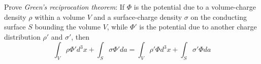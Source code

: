 \documentclass{article}
\begin{document}
\setcounter{problem}{11}
\begin{problem}
	Prove \textit{Green's reciprocation theorem}: If $\Phi$ is the potential due to a volume-charge density $\rho$ within a volume $V$ and a surface-charge density $\sigma$ on the conducting surface $S$ bounding the volume $V$, while $\Phi'$ is the potential due to another charge distribution $\rho'$ and $\sigma'$, then
	\[ \int_{V}\rho\Phi' d^{3}x + \int_{S}\sigma\Phi' da = \int_{V}\rho'\Phi d^{3}x + \int_{S}\sigma'\Phi da \]
\end{problem}
\end{document}
